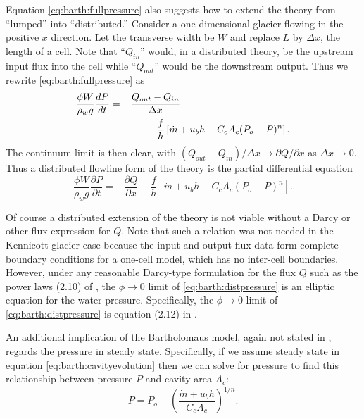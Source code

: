 \documentclass[twocolumn,letterpaper]{igs}
\begin{document}
Equation \eqref{eq:barth:fullpressure} also suggests how to extend the \cite{Bartholomausetal2011} theory from ``lumped'' into ``distributed.''  Consider a one-dimensional glacier flowing in the positive $x$ direction.  Let the transverse width be $W$ and replace $L$ by $\Delta x$, the length of a cell.  Note that ``$Q_{in}$'' would, in a distributed theory, be the upstream input flux into the cell while ``$Q_{out}$'' would be the downstream output.  Thus we rewrite \eqref{eq:barth:fullpressure} as
\begin{align}
&\frac{\phi W}{\rho_w g}\frac{dP}{dt} = - \frac{Q_{out} - Q_{in}}{\Delta x} \\
&\qquad \qquad \qquad \quad - \frac{f}{h} \left[\dot m + u_b h - C_c A_c (P_o-P)^n\right]. \notag
\end{align}
The continuum limit is then clear, with $(Q_{out} - Q_{in})/\Delta x \to \partial Q/\partial x$ as $\Delta x \to 0$.  Thus a distributed flowline form of the \cite{Bartholomausetal2011} theory is the partial differential equation
\begin{equation}
\frac{\phi W}{\rho_w g} \frac{\partial P}{\partial t} = - \frac{\partial Q}{\partial x} - \frac{f}{h} \left[\dot m + u_b h - C_c A_c (P_o-P)^n\right]. \label{eq:barth:distpressure}
\end{equation}

Of course a distributed extension of the \cite{Bartholomausetal2011} theory is not viable without a Darcy or other flux expression for $Q$.  Note that such a relation was not needed in the Kennicott glacier case because the input and output flux data form complete boundary conditions for a one-cell model, which has no inter-cell boundaries.  However, under any reasonable Darcy-type formulation for the flux $Q$ such as the power laws (2.10) of \cite{Schoofetal2012}, the $\phi\to 0$ limit of \eqref{eq:barth:distpressure} is an elliptic equation for the water pressure.  Specifically, the $\phi\to 0$ limit of \eqref{eq:barth:distpressure} is equation (2.12) in \cite{Schoofetal2012}.

An additional implication of the Bartholomaus model, again not stated in \cite{Bartholomausetal2011}, regards the pressure in steady state.  Specifically, if we assume steady state in equation \eqref{eq:barth:cavityevolution} then we can solve for pressure to find this relationship between pressure $P$ and cavity area $A_c$:
\begin{equation}
P = P_o - \left(\frac{\dot m + u_b h}{C_c A_c}\right)^{1/n}. \label{eq:barth:steadypressure}
\end{equation}
\end{document}
